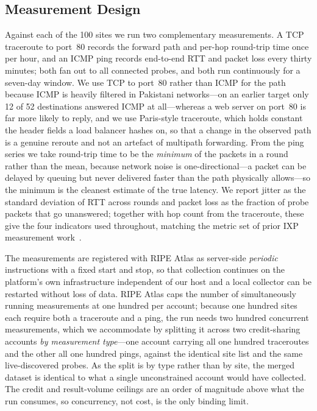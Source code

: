 \documentclass[sigconf,anonymous,10pt]{acmart}
\begin{document}
\subsection{Measurement Design}
Against each of the 100 sites we run two complementary measurements. A TCP traceroute to port~80
records the forward path and per-hop round-trip time once per hour, and an ICMP ping records
end-to-end RTT and packet loss every thirty minutes; both fan out to all connected probes, and both
run continuously for a seven-day window. We use TCP to port~80 rather than ICMP for the path because
ICMP is heavily filtered in Pakistani networks---on an earlier target only 12 of 52 destinations
answered ICMP at all---whereas a web server on port~80 is far more likely to reply, and we use
Paris-style traceroute, which holds constant the header fields a load balancer hashes on, so that a
change in the observed path is a genuine reroute and not an artefact of multipath forwarding. From
the ping series we take round-trip time to be the \emph{minimum} of the packets in a round rather
than the mean, because network noise is one-directional---a packet can be delayed by queuing but
never delivered faster than the path physically allows---so the minimum is the cleanest estimate of
the true latency. We report jitter as the standard deviation of RTT across rounds and packet loss as
the fraction of probe packets that go unanswered; together with hop count from the traceroute, these
give the four indicators used throughout, matching the metric set of prior IXP measurement
work~\cite{dibartolomeo2015}.

The measurements are registered with RIPE Atlas as server-side \emph{periodic} instructions with a
fixed start and stop, so that collection continues on the platform's own infrastructure independent
of our host and a local collector can be restarted without loss of data. RIPE Atlas caps the number
of simultaneously running measurements at one hundred per account; because one hundred sites each
require both a traceroute and a ping, the run needs two hundred concurrent measurements, which we
accommodate by splitting it across two credit-sharing accounts \emph{by measurement type}---one
account carrying all one hundred traceroutes and the other all one hundred pings, against the
identical site list and the same live-discovered probes. As the split is by type rather than by
site, the merged dataset is identical to what a single unconstrained account would have collected.
The credit and result-volume ceilings are an order of magnitude above what the run consumes, so
concurrency, not cost, is the only binding limit.
\end{document}

